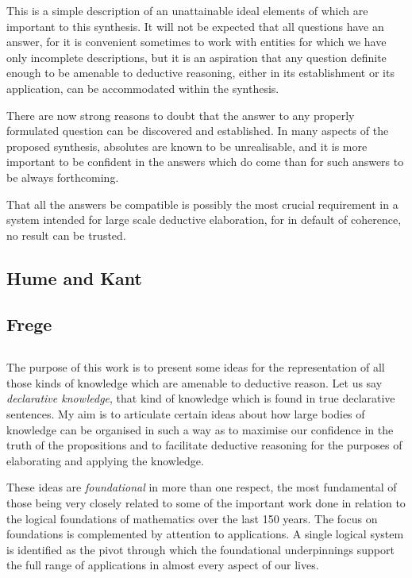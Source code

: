 \documentclass[10pt,titlepage]{book}
\begin{document}
This is a simple description of an unattainable ideal elements of which are important to this synthesis.
It will not be expected that all questions have an answer, for it is convenient sometimes to work with entities for which we have only incomplete descriptions, but it is an aspiration that any question definite enough to be amenable to deductive reasoning, either in its establishment or its application, can be accommodated within the synthesis.

There are now strong reasons to doubt that the answer to any properly formulated question can be discovered and established.
In many aspects of the proposed synthesis, absolutes are known to be unrealisable, and it is more important to be confident in the answers which do come than for such answers to be always forthcoming.

That all the answers be compatible is possibly the most crucial requirement in a system intended for large scale deductive elaboration, for in default of coherence, no result can be trusted.

\subsection{Hume and Kant}



\subsection{Frege}

\cite{frege1980}


\subsection{}

The purpose of this work is to present some ideas for the representation of all those kinds of knowledge which are amenable to deductive reason.
Let us say \emph{declarative knowledge}, that kind of knowledge which is found in true declarative sentences.
My aim is to articulate certain ideas about how large bodies of knowledge can be organised in such a way as to maximise our confidence in the truth of the propositions and to facilitate deductive reasoning for the purposes of elaborating and applying the knowledge.

These ideas are \emph{foundational} in more than one respect, the most fundamental of those being very closely related to some of the important work done in relation to the logical foundations of mathematics over the last 150 years.
The focus on foundations is complemented by attention to applications.
A single logical system is identified as the pivot through which the foundational underpinnings support the full range of applications in almost every aspect of our lives.
\end{document}
